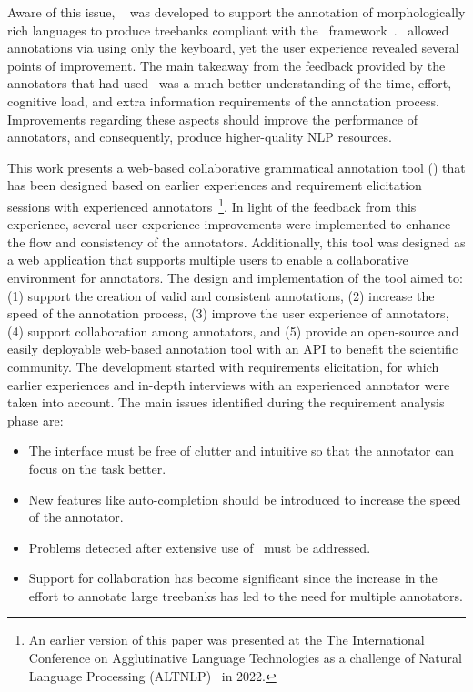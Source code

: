 Aware of this issue, \boatvone~\cite{anon} was developed to support the annotation of morphologically rich languages to produce treebanks compliant with the \ud\ framework~\cite{ud}. \boatvone\ allowed annotations via using only the keyboard, yet the user experience revealed several points of improvement.
The main takeaway from the feedback provided by the annotators that had used \boatvone\ was a much better understanding of the time, effort, cognitive load, and extra information requirements of the annotation process.
Improvements regarding these aspects should improve the performance of annotators, and consequently, produce higher-quality NLP resources.

This work presents a web-based collaborative grammatical annotation tool (\boatvtwo) that has been designed based on earlier experiences and requirement elicitation sessions with experienced annotators~\footnote{An earlier version of this paper was presented at the The International Conference on Agglutinative Language Technologies as a challenge of Natural Language Processing (ALTNLP)~\cite{altnlp} in 2022.}.
In light of the feedback from this experience, several user experience improvements were implemented to enhance the flow and consistency of the annotators.
Additionally, this tool was designed as a web application that supports multiple users to enable a collaborative environment for annotators.
The design and implementation of the tool aimed to: (1) support the creation of valid and consistent annotations, (2) increase the speed of the annotation process, (3) improve the user experience of annotators, (4) support collaboration among annotators, and (5) provide an open-source and easily deployable web-based annotation tool with an API to benefit the scientific community.
The development started with requirements elicitation, for which earlier experiences and in-depth interviews with an experienced annotator were taken into account.
The main issues identified during the requirement analysis phase are:
\begin{itemize}
\setlength\itemsep{0em}
\item The interface must be free of clutter and intuitive so that the annotator can focus on the task better.
\item New features like auto-completion should be introduced to increase the speed of the annotator.
\item Problems detected after extensive use of \boatvone\ must be addressed.
\item Support for collaboration has become significant since the increase in the effort to annotate large treebanks has led to the need for multiple annotators.
\end{itemize}

